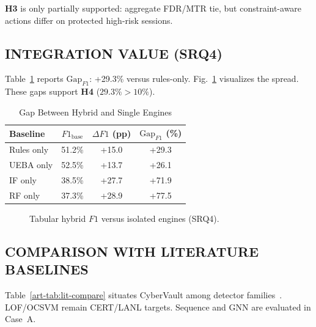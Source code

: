 \textbf{H3} is only partially supported: aggregate FDR/MTR tie, but constraint-aware actions differ on protected high-risk sessions.

\subsection{INTEGRATION VALUE (SRQ4)}
Table~\ref{art-tab:gap-matrix} reports $\mathrm{Gap}_{F1}$: +29.3\% versus rules-only. Fig.~\ref{art-fig:integration} visualizes the spread. These gaps support \textbf{H4} ($29.3\% > 10\%$).

\begin{table}[H]
\caption{Gap Between Hybrid and Single Engines}
\label{art-tab:gap-matrix}
\centering
\scriptsize
\begin{tabular}{@{}lccc@{}}
\toprule
\textbf{Baseline} & $F1_{\mathrm{base}}$ & $\Delta F1$ (pp) & $\mathrm{Gap}_{F1}$ (\%) \\
\midrule
Rules only & 51.2\% & +15.0 & +29.3 \\
UEBA only & 52.5\% & +13.7 & +26.1 \\
IF only & 38.5\% & +27.7 & +71.9 \\
RF only & 37.3\% & +28.9 & +77.5 \\
\bottomrule
\end{tabular}
\end{table}

\begin{figure}[H]
\centering
{}
\caption{Tabular hybrid $F1$ versus isolated engines (SRQ4).}
\label{art-fig:integration}
\end{figure}

\subsection{COMPARISON WITH LITERATURE BASELINES}
Table~\ref{art-tab:lit-compare} situates CyberVault among detector families~\cite{ref6,ref24}. LOF/OCSVM remain CERT/LANL targets. Sequence and GNN are evaluated in Case~A.

